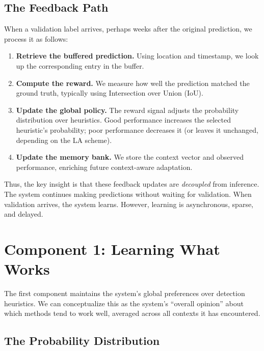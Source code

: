 \documentclass[11pt,a4paper]{article}
\begin{document}
\subsection{The Feedback Path}

When a validation label arrives, perhaps weeks after the original prediction, we process it as follows:

\begin{enumerate}
    \item \textbf{Retrieve the buffered prediction.} Using location and timestamp, we look up the corresponding entry in the buffer.

    \item \textbf{Compute the reward.} We measure how well the prediction matched the ground truth, typically using Intersection over Union (IoU).

    \item \textbf{Update the global policy.} The reward signal adjusts the probability distribution over heuristics. Good performance increases the selected heuristic's probability; poor performance decreases it (or leaves it unchanged, depending on the LA scheme).

    \item \textbf{Update the memory bank.} We store the context vector and observed performance, enriching future context-aware adaptation.
\end{enumerate}

Thus, the key insight is that these feedback updates are \emph{decoupled} from inference. The system continues making predictions without waiting for validation. When validation arrives, the system learns. However, learning is asynchronous, sparse, and delayed.


\section{Component 1: Learning What Works}
\label{sec:component1}

The first component maintains the system's global preferences over detection heuristics. We can conceptualize this as the system's ``overall opinion'' about which methods tend to work well, averaged across all contexts it has encountered.

\subsection{The Probability Distribution}
\end{document}
